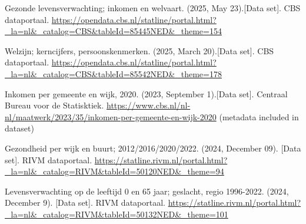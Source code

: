 \documentclass[
]{article}
\begin{document}
Gezonde levensverwachting; inkomen en welvaart. (2025, May 23).{[}Data
set{]}. CBS dataportaal.
\url{https://opendata.cbs.nl/statline/portal.html?_la=nl&_catalog=CBS&tableId=85445NED&_theme=154}

Welzijn; kerncijfers, persoonskenmerken. (2025, March 20).{[}Data
set{]}. CBS dataportaal.
\url{https://opendata.cbs.nl/statline/portal.html?_la=nl&_catalog=CBS&tableId=85542NED&_theme=178}

Inkomen per gemeente en wijk, 2020. (2023, September 1).{[}Data set{]}.
Centraal Bureau voor de Statisktiek.
\url{https://www.cbs.nl/nl-nl/maatwerk/2023/35/inkomen-per-gemeente-en-wijk-2020}
(metadata included in dataset)

Gezondheid per wijk en buurt; 2012/2016/2020/2022. (2024, December 09).
{[}Data set{]}. RIVM dataportaal.
\url{https://statline.rivm.nl/portal.html?_la=nl&_catalog=RIVM&tableId=50120NED&_theme=94}

Levensverwachting op de leeftijd 0 en 65 jaar; geslacht, regio
1996-2022. (2024, December 9). {[}Data set{]}. RIVM dataportaal.
\url{https://statline.rivm.nl/portal.html?_la=nl&_catalog=RIVM&tableId=50132NED&_theme=101}
\end{document}
